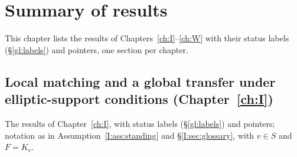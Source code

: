 \chapter{Summary of results}\label{ch:summary}
This chapter lists the results of Chapters~\ref{ch:I}--\ref{ch:W} with their status labels (\S\ref{gl:labels}) and pointers, one section per chapter.

\begingroup
\providecommand{\ov}{}\renewcommand{\ov}[1]{\overline{#1}}
\providecommand{\eps}{}\renewcommand{\eps}{\epsilon}
\providecommand{\A}{}\renewcommand{\A}{\mathbb{A}}
\providecommand{\C}{}\renewcommand{\C}{\mathbb{C}}
\providecommand{\Q}{}\renewcommand{\Q}{\mathbb{Q}}
\providecommand{\Z}{}\renewcommand{\Z}{\mathbb{Z}}
\providecommand{\cO}{}\renewcommand{\cO}{\mathcal{O}}
\providecommand{\gen}{}\renewcommand{\gen}{\mathrm{gen}}
\providecommand{\reg}{}\renewcommand{\reg}{\mathrm{reg}}
\providecommand{\tr}{}\renewcommand{\tr}{\operatorname{tr}}
\providecommand{\Gal}{}\renewcommand{\Gal}{\operatorname{Gal}}
\providecommand{\Aut}{}\renewcommand{\Aut}{\operatorname{Aut}}
\providecommand{\Nrd}{}\renewcommand{\Nrd}{\operatorname{Nrd}}
\providecommand{\Ad}{}\renewcommand{\Ad}{\operatorname{Ad}}
\providecommand{\Hom}{}\renewcommand{\Hom}{\operatorname{Hom}}
\providecommand{\Iso}{}\renewcommand{\Iso}{\operatorname{Iso}}
\providecommand{\vol}{}\renewcommand{\vol}{\operatorname{vol}}
\providecommand{\supp}{}\renewcommand{\supp}{\operatorname{supp}}
\providecommand{\diag}{}\renewcommand{\diag}{\operatorname{diag}}
\providecommand{\GL}{}\renewcommand{\GL}{\mathrm{GL}}
\providecommand{\SL}{}\renewcommand{\SL}{\mathrm{SL}}
\providecommand{\Gb}{}\renewcommand{\Gb}{\ov{G}}
\providecommand{\Zb}{}\renewcommand{\Zb}{\ov{Z}}
\providecommand{\GDb}{}\renewcommand{\GDb}{\ov{G}_D}
\providecommand{\pib}{}\renewcommand{\pib}{\ov{\pi}}
\providecommand{\ks}{}\renewcommand{\ks}{\kappa^{*}}
\providecommand{\Eb}{}\renewcommand{\Eb}{\ov{E}}
\providecommand{\Tb}{}\renewcommand{\Tb}{\ov{T}}
\providecommand{\cG}{}\renewcommand{\cG}{\mathcal{G}}
\providecommand{\cGb}{}\renewcommand{\cGb}{\ov{\mathcal{G}}}
\providecommand{\iD}{}\renewcommand{\iD}{\iota_D}
\providecommand{\iG}{}\renewcommand{\iG}{\iota_{\GL}}
\providecommand{\jj}{}\renewcommand{\jj}{\jmath}
\providecommand{\Pv}{}\renewcommand{\Pv}{\textbf{(P)}}
\providecommand{\Ev}{}\renewcommand{\Ev}{\textbf{(E)}}
\providecommand{\Ov}{}\renewcommand{\Ov}{\textbf{(O)}}
\providecommand{\Cv}{}\renewcommand{\Cv}{\textbf{(C)}}
\section{\texorpdfstring{Local matching and a global transfer under elliptic-support conditions (Chapter~\ref{ch:I})}{Local matching and a global transfer under elliptic-support conditions (Chapter 4)}}\label{I:sec:summary}
The results of Chapter~\ref{ch:I}, with status labels (\S\ref{gl:labels}) and pointers; notation as in Assumption~\ref{I:ass:standing} and \S\ref{I:sec:glossary}, with $v\in S$ and $F=K_v$.

